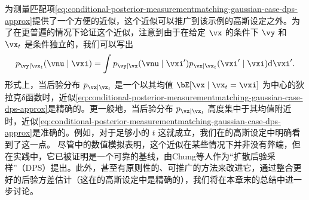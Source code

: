 \documentclass[../../book-main_zh.tex]{subfiles}
\begin{document}
为测量匹配项\eqref{eq:conditional-posterior-measurementmatching-gaussian-case-dps-approx}提供了一个方便的近似，这个近似可以推广到该示例的高斯设定之外。为了在更普遍的情况下论证这个近似，注意到由于在给定 $\vx$ 的条件下 $\vy$ 和 $\vx_t$ 是条件独立的，我们可以写出
\begin{equation}
  p_{\vy \mid \vx_t}(\vnu \mid \vxi)
  =
  \int p_{\vy \mid \vx}(\vnu \mid \vxi') p_{\vx \mid \vx_t}(\vxi' \mid \vxi)
  \odif  \vxi'.
\end{equation}
形式上，当后验分布 $p_{\vx\mid \vx_t}$ 是一个以其均值 $\bE[\vx \mid \vx_t=\vxi]$ 为中心的狄拉克δ函数时，近似\eqref{eq:conditional-posterior-measurementmatching-gaussian-case-dps-approx}是精确的。更一般地，当后验分布 $p_{\vx \mid \vx_t}$ 高度集中于其均值附近时，近似\eqref{eq:conditional-posterior-measurementmatching-gaussian-case-dps-approx}是准确的。例如，对于足够小的 $t$ 这就成立，我们在的高斯设定中明确看到了这一点。
尽管中的数值模拟表明，这个近似在某些情况下并非没有弊端，但在实践中，它已被证明是一个可靠的基线，由Chung等人作为“扩散后验采样”（DPS）提出\cite{chung2023diffusion}。此外，甚至有原则性的、可推广的方法来改进它，通过整合更好的后验方差估计（这在的高斯设定中是精确的），我们将在本章末的总结中进一步讨论。
\end{document}
